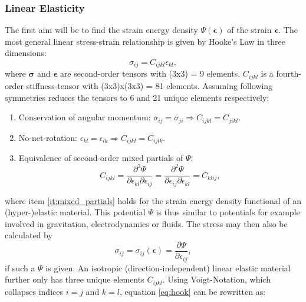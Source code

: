 \documentclass[m,times]{cgMA}
\begin{document}
\subsubsection{Linear Elasticity}\label{sec:linear_elasticty}
The first aim will be to find the strain energy density $\Psi(\boldsymbol{\epsilon})$ of the strain $\bm{\epsilon}$. The most general linear stress-strain relationship is given by Hooke's Law in three dimensions:
\begin{equation}\label{eq:hook}
  \sigma_{ij} = C_{ijkl} \epsilon_{kl},
\end{equation}
where $\boldsymbol{\sigma}$ and $\bm{\epsilon}$ are second-order tensors with (3x3) = 9 elements. $C_{ijkl}$ is a fourth-order stiffness-tensor with (3x3)x(3x3) = 81 elements.
Assuming following symmetries reduces the tensors to 6 and 21 unique elements respectively:
\begin{enumerate}
  \item Conservation of angular momentum: $\sigma_{ij} = \sigma_{ji} \Rightarrow C_{ijkl} = C_{jikl}$.
  \item No-net-rotation: $\epsilon_{kl} = \epsilon_{lk} \Rightarrow C_{ijkl} = C_{ijlk}$.
  \item \label{it:mixed_partials}Equivalence of second-order mixed partials of $\Psi$:
    \begin{equation}
      C _ { i j k l } = \frac { \partial ^ { 2 } { \Psi } } { \partial \epsilon _ { k l } \partial \epsilon _ { i j } } = \frac { \partial ^ { 2 } { \Psi } } { \partial \epsilon _ { i j } \partial \epsilon _ { k l } } = C _ { k l i j },
    \end{equation}
\end{enumerate}
where item \ref{it:mixed_partials} holds for the strain energy density functional of an (hyper-)elastic material. This potential $\Psi$ is thus similar to potentials for example involved in gravitation, electrodynamics or fluids. The stress may then also be calculated by
\begin{equation}\label{eq:partial_energy}
  \sigma _ { i j } = \sigma _ { i j } ( \boldsymbol{\epsilon} ) = \frac { \partial { \Psi } } { \partial \epsilon _ { i j } },
\end{equation}
if such a $\Psi$ is given. An isotropic (direction-independent) linear elastic material further only has three unique elements $C _ {i j k l}$. Using Voigt-Notation, which collapses indices $i=j$ and $k=l$, equation \ref{eq:hook} can be rewritten as:
\end{document}

